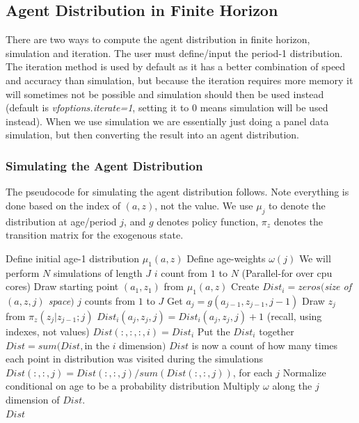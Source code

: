 \subsection{Agent Distribution in Finite Horizon}
There are two ways to compute the agent distribution in finite horizon, simulation and iteration. The user must define/input the period-1 distribution. The iteration method is used by default as it has a better combination of speed and accuracy than simulation, but because the iteration requires more memory it will sometimes not be possible and simulation should then be used instead (default is \textit{vfoptions.iterate=1}, setting it to 0 means simulation will be used instead). When we use simulation we are essentially just doing a panel data simulation, but then converting the result into an agent distribution.


\subsubsection{Simulating the Agent Distribution}
The pseudocode for simulating the agent distribution follows. Note everything is done based on the index of $(a,z)$, not the value. We use $\mu_j$ to denote the distribution at age/period $j$, and $g$ denotes policy function, $\pi_z$ denotes the transition matrix for the exogenous state.
\begin{algorithmic}
 \State Define initial age-1 distribution $\mu_1(a,z)$
 \State Define age-weights $\omega(j)$
 \State We will perform $N$ simulations of length $J$
 \For $i$ count from $1$ to $N$ (Parallel-for over cpu cores)
  \State Draw starting point $(a_1,z_1)$ from $\mu_1(a,z)$
  \State Create $Dist_i=zeros($\textit{size of $(a,z,j)$ space}$)$
  \For $j$ counts from $1$ to $J$
   \State Get $a_j=g(a_{j-1},z_{j-1},j-1)$
   \State Draw $z_j$ from $\pi_z(z_j|z_{j-1};j)$
   \State $Dist_i(a_j, z_j,j)=Dist_i(a_j, z_j,j)+1$ (recall, using indexes, not values)
  \EndFor
 \EndFor
 \State $Dist(:,:,:,i)=Dist_i$ \Comment Put the $Dist_i$ together
 \State $Dist=sum(Dist,$in the $i$ dimension$)$
 \Comment $Dist$ is now a count of how many times each point in distribution was visited during the simulations
 \State $Dist(:,:,j)=Dist(:,:,j)/sum(Dist(:,:,j))$, for each $j$
 \Comment Normalize conditional on age to be a probability distribution
 \State Multiply $\omega$ along the $j$ dimension of $Dist$.
 \\ \Return $Dist$
\end{algorithmic}

